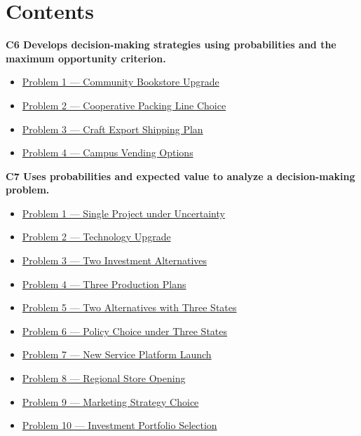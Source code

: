 



	
	\section*{Contents}
	\noindent\textbf{C6 Develops decision-making strategies using probabilities and the maximum opportunity criterion.}
	\begin{itemize}
		\item \hyperlink{c6-ex1}{Problem 1 — Community Bookstore Upgrade}
		\item \hyperlink{c6-ex2}{Problem 2 — Cooperative Packing Line Choice}
		\item \hyperlink{c6-ex3}{Problem 3 — Craft Export Shipping Plan}
		\item \hyperlink{c6-ex4}{Problem 4 — Campus Vending Options}
	\end{itemize}
	\noindent\textbf{C7 Uses probabilities and expected value to analyze a decision-making problem.}
	\begin{itemize}
		\item \hyperlink{c7-ex1}{Problem 1 — Single Project under Uncertainty}
		\item \hyperlink{c7-ex2}{Problem 2 — Technology Upgrade}
		\item \hyperlink{c7-ex3}{Problem 3 — Two Investment Alternatives}
		\item \hyperlink{c7-ex4}{Problem 4 — Three Production Plans}
		\item \hyperlink{c7-ex5}{Problem 5 — Two Alternatives with Three States}
		\item \hyperlink{c7-ex6}{Problem 6 — Policy Choice under Three States}
		\item \hyperlink{c7-ex7}{Problem 7 — New Service Platform Launch}
		\item \hyperlink{c7-ex8}{Problem 8 — Regional Store Opening}
		\item \hyperlink{c7-ex9}{Problem 9 — Marketing Strategy Choice}
		\item \hyperlink{c7-ex10}{Problem 10 — Investment Portfolio Selection}
	\end{itemize}
	
	
	
